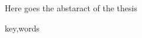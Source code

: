\begin{abstracteng}
Here goes the abstaract of the thesis

   \begin{keywordseng}
      key,words
   \end{keywordseng}

\end{abstracteng}
